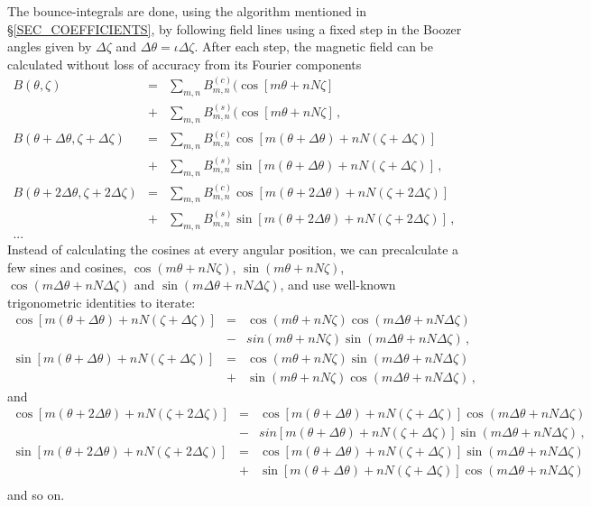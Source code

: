 The bounce-integrals are done, using the algorithm mentioned in \S\ref{SEC_COEFFICIENTS}, by following field lines using a fixed step in the Boozer angles given by $\Delta\zeta$ and $\Delta\theta=\iota\Delta\zeta$. After each step, the magnetic field can be calculated without loss of accuracy from its Fourier components
\begin{eqnarray}
B(\theta,\zeta)&=&\sum_{m,n}  B_{m,n}^{(c)}(\cos[m\theta+nN\zeta]\nonumber\\
  &+&\sum_{m,n}  B_{m,n}^{(s)}(\cos[m\theta+nN\zeta]\,,\nonumber\\
B(\theta+\Delta\theta,\zeta+\Delta\zeta)&=&\sum_{m,n} B_{m,n}^{(c)}\cos[m(\theta+\Delta\theta)+nN(\zeta+\Delta\zeta)]\nonumber\\
&+&\sum_{m,n} B_{m,n}^{(s)}\sin[m(\theta+\Delta\theta)+nN(\zeta+\Delta\zeta)]\,,\nonumber\\
B(\theta+2\Delta\theta,\zeta+2\Delta\zeta)&=&\sum_{m,n} B_{m,n}^{(c)}\cos[m(\theta+2\Delta\theta)+nN(\zeta+2\Delta\zeta)]\nonumber\\
&+&\sum_{m,n} B_{m,n}^{(s)}\sin[m(\theta+2\Delta\theta)+nN(\zeta+2\Delta\zeta)]\,,\nonumber\\
...
\end{eqnarray}
Instead of calculating the cosines at every angular position, we can precalculate a few sines and cosines, $\cos(m\theta+nN\zeta)$, $\sin(m\theta+nN\zeta)$, $\cos(m\Delta\theta+nN\Delta\zeta)$ and $\sin(m\Delta\theta+nN\Delta\zeta)$, and use well-known trigonometric identities to iterate:
 \begin{eqnarray}
\cos[m(\theta+\Delta\theta)+nN(\zeta+\Delta\zeta)] & = &\cos(m\theta+nN\zeta)\cos(m\Delta\theta+nN\Delta\zeta)\nonumber\\
&-& sin(m\theta+nN\zeta)\sin(m\Delta\theta+nN\Delta\zeta)\,,\nonumber\\
\sin[m(\theta+\Delta\theta)+nN(\zeta+\Delta\zeta)] & =& \cos(m\theta+nN\zeta)\sin(m\Delta\theta+nN\Delta\zeta)\nonumber\\
&+& \sin(m\theta+nN\zeta)\cos(m\Delta\theta+nN\Delta\zeta)\,,
\end{eqnarray}
and
 \begin{eqnarray}
\cos[m(\theta+2\Delta\theta)+nN(\zeta+2\Delta\zeta)] & =& \cos[m(\theta+\Delta\theta)+nN(\zeta+\Delta\zeta)]\cos(m\Delta\theta+nN\Delta\zeta)\nonumber\\
&-& sin[m(\theta+\Delta\theta)+nN(\zeta+\Delta\zeta)]\sin(m\Delta\theta+nN\Delta\zeta)\,,\nonumber\\
\sin[m(\theta+2\Delta\theta)+nN(\zeta+2\Delta\zeta)] & = &\cos[m(\theta+\Delta\theta)+nN(\zeta+\Delta\zeta)]\sin(m\Delta\theta+nN\Delta\zeta)\nonumber\\
&+& \sin[m(\theta+\Delta\theta)+nN(\zeta+\Delta\zeta)]\cos(m\Delta\theta+nN\Delta\zeta)\,\nonumber\\
\end{eqnarray}
and so on.



